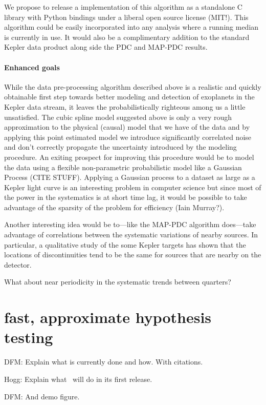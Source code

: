 \documentclass[letterpaper,12pt,preprint]{hack_aastex}
\newcommand{\Turnstile}{\package{IronHorse}}
\begin{document}
We propose to release a implementation of this algorithm as a standalone C
library with Python bindings under a liberal open source license (MIT!).
This algorithm could be easily incorporated into any analysis where a running
median is currently in use.
It would also be a complimentary addition to the standard Kepler data
product along side the PDC and MAP-PDC results.


\paragraph{Enhanced goals}
While the data pre-processing algorithm described above is a realistic and
quickly obtainable first step towards better modeling and detection of
exoplanets in the Kepler data stream, it leaves the probabilistically
righteous among us a little unsatisfied.
The cubic spline model suggested above is only a very rough approximation to
the physical (causal) model that we have of the data and by applying this
point estimated model we introduce significantly correlated noise and don't
correctly propagate the uncertainty introduced by the modeling procedure.
An exiting prospect for improving this procedure would be to model the data
using a flexible non-parametric probabilistic model like a Gaussian Process
 (CITE STUFF).
Applying a Gaussian process to a dataset as large as a Kepler light curve is
an interesting problem in computer science but since most of the power in the
systematics is at short time lag, it would be possible to take advantage of
the sparsity of the problem for efficiency (Iain Murray?).

Another interesting idea would be to---like the MAP-PDC algorithm does---take
advantage of correlations between the systematic variations of nearby sources.
In particular, a qualitative study of the some Kepler targets has shown that
the locations of discontinuities tend to be the same for sources that are
nearby on the detector.

What about near periodicity in the systematic trends between quarters?

\section{fast, approximate hypothesis testing}

DFM:  Explain what is currently done and how.  With citations.

Hogg:  Explain what \Turnstile\ will do in its first release.

DFM:  And demo figure.
\end{document}
